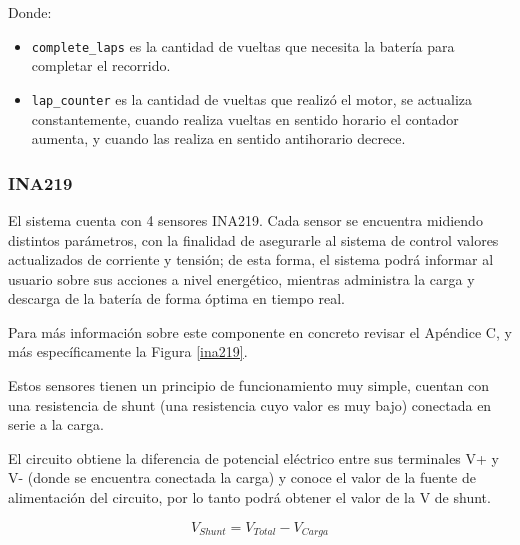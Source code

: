                    Donde:\par
                    \begin{itemize} [label=•]
                \setlength{\itemindent}{1.5em}
                
                        \item \texttt{complete\_laps} es la cantidad de vueltas que necesita la batería para completar el recorrido.
                        \item \texttt{lap\_counter} es la cantidad de vueltas que realizó el motor, se actualiza constantemente, cuando realiza vueltas en sentido horario el contador aumenta, y cuando las realiza en sentido antihorario decrece.
                    \end{itemize}
                    
            \subsubsection{INA219}
                El sistema cuenta con 4 sensores INA219. Cada sensor se encuentra midiendo distintos parámetros, con la finalidad de asegurarle al sistema de control valores actualizados de corriente y tensión; de esta forma, el sistema podrá informar al usuario sobre sus acciones a nivel energético, mientras administra la carga y descarga de la batería de forma óptima en tiempo real.\par
                Para más información sobre este componente en concreto revisar el Apéndice C, y más específicamente la Figura \ref{ina219}.\par

                    Estos sensores tienen un principio de funcionamiento muy simple, cuentan con una resistencia de shunt (una resistencia cuyo valor es muy bajo) conectada en serie a la carga.\par
                    El circuito obtiene la diferencia de potencial eléctrico entre sus terminales V+ y V- (donde se encuentra conectada la carga) y conoce el valor de la fuente de alimentación del circuito, por lo tanto podrá obtener el valor de la V de shunt.\par
                    
                        \begin{equation}
                            V_{Shunt} = V_{Total} - V_{Carga}
                        \end{equation}

